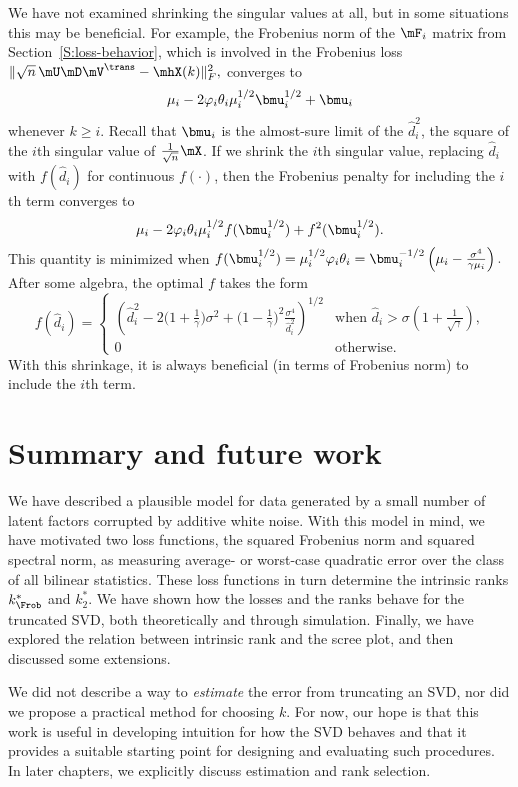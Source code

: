 We have not examined shrinking the singular values at all, but in some 
situations this may be beneficial.  For example, the Frobenius norm of the $\mF_i$ matrix from Section~\ref{S:loss-behavior}, which is involved in the Frobenius loss
\(
    \| \sqrt{n} \, \mU \mD \mV^\trans - \mhX(k) \|_F^2,
\)
converges to
\[
    \mu_i - 2 \varphi_i \theta_i \mu_i^{1/2} \bmu_i^{1/2} + \bmu_i
\]
whenever $k \geq i$.  Recall that $\bmu_i$ is the almost-sure limit of
the $\hat d_i^2$, the square of the $i$th singular value of $\frac{1}{\sqrt{n}} \mX$.  If we shrink the $i$th singular value, replacing
$\hat d_i$ with $f(\hat d_i)$ for continuous $f(\cdot)$, then the Frobenius penalty for including the $i$th term converges to
\[
    \mu_i 
    - 2 \varphi_i \theta_i \mu_i^{1/2} f( \bmu_i^{1/2} ) 
    + f^2( \bmu_i^{1/2} ).
\]
This quantity is minimized when
\(
    f( \bmu_i^{1/2}) 
        = \mu_i^{1/2} \varphi_i \theta_i
        = \bmu_i^{-1/2} 
          \left( \mu_i - \frac{\sigma^4}{ \gamma \mu_i } \right).               
\)
After some algebra, the optimal $f$ takes the form
\[
    f( \hat d_i )
        =
        \begin{cases}
        \left(
            \hat d_i^2
            -
            2
            \big(
                1 + \frac{1}{\gamma}
            \big)
            \sigma^2
            +
            \big(
                1 - \frac{1}{\gamma}
            \big)^2
            \frac{\sigma^4}
                 {\hat d_i^2}
        \right)^{1/2}
            &\text{when $\hat d_i 
                         > 
                         \sigma 
                         \left(
                            1 + \frac{1}{\sqrt{\gamma}}
                         \right)$,} \\
        0 
            &\text{otherwise.}
        \end{cases}
\]
With this shrinkage, it is always beneficial (in terms of Frobenius norm) to include the $i$th term.

\section{Summary and future work}\label{S:intrinsic-rank-summary}

We have described a plausible model for data generated by a small number of
latent factors corrupted by additive white noise. With this model in mind, we
have motivated two loss functions, the squared Frobenius norm and squared
spectral norm, as measuring average- or worst-case quadratic error over the
class of all bilinear statistics. These loss functions in turn determine the
intrinsic ranks $k_\Frob^\ast$ and $k_2^\ast$. We have shown how the losses
and the ranks behave for the truncated SVD, both theoretically and through
simulation. Finally, we have explored the relation between intrinsic rank and
the scree plot, and then discussed some extensions.

We did not describe a way to \emph{estimate} the error from truncating an SVD,
nor did we propose a practical method for choosing $k$. For now, our hope is
that this work is useful in developing intuition for how the SVD behaves and
that it provides a suitable starting point for designing and evaluating such
procedures. In later chapters, we explicitly discuss estimation and rank
selection.
